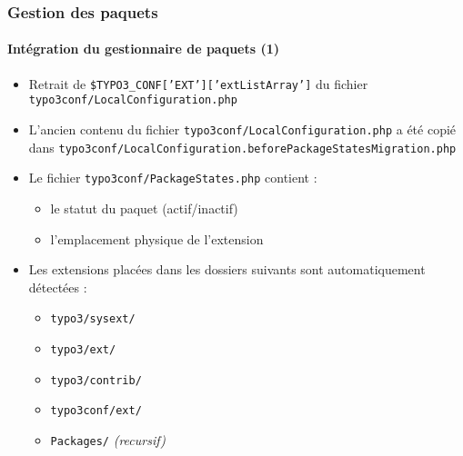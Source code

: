 \begin{frame}[fragile]
	\frametitle{Gestion des paquets}
	\framesubtitle{Intégration du gestionnaire de paquets (1)}

	\begin{itemize}
		\item Retrait de \texttt{\$TYPO3\_CONF['EXT']['extListArray']} du fichier\newline
			\smaller\texttt{typo3conf/LocalConfiguration.php}\normalsize

		\item L'ancien contenu du fichier \small\texttt{typo3conf/LocalConfiguration.php} a été copié dans \normalsize\newline
			\smaller\texttt{typo3conf/LocalConfiguration.beforePackageStatesMigration.php}\normalsize

		\item Le fichier \texttt{typo3conf/PackageStates.php} contient :

			\begin{itemize}
				\item le statut du paquet (actif/inactif)
				\item l'emplacement physique de l'extension
			\end{itemize}

		\item Les extensions placées dans les dossiers suivants sont automatiquement détectées :
			\begin{itemize}
				\item \texttt{typo3/sysext/}
				\item \texttt{typo3/ext/}
				\item \texttt{typo3/contrib/}
				\item \texttt{typo3conf/ext/}
				\item \texttt{Packages/} \emph{(recursif)}
			\end{itemize}

	\end{itemize}

\end{frame}


